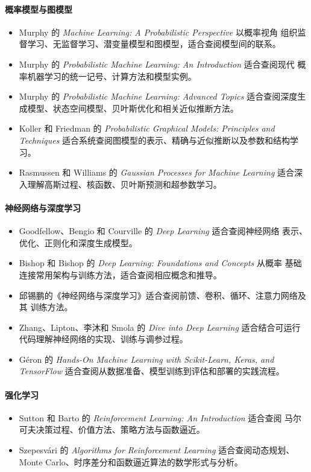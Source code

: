 \paragraph*{概率模型与图模型}
\begin{itemize}
  \item Murphy 的 \emph{Machine Learning: A Probabilistic Perspective} 以概率视角
    组织监督学习、无监督学习、潜变量模型和图模型，适合查阅模型间的联系。
  \item Murphy 的 \emph{Probabilistic Machine Learning: An Introduction} 适合查阅现代
    概率机器学习的统一记号、计算方法和模型实例。
  \item Murphy 的 \emph{Probabilistic Machine Learning: Advanced Topics}
    适合查阅深度生成模型、状态空间模型、贝叶斯优化和相关近似推断方法。
  \item Koller 和 Friedman 的 \emph{Probabilistic Graphical Models: Principles and
    Techniques} 适合系统查阅图模型的表示、精确与近似推断以及参数和结构学习。
  \item Rasmussen 和 Williams 的 \emph{Gaussian Processes for Machine Learning}
    适合深入理解高斯过程、核函数、贝叶斯预测和超参数学习。
\end{itemize}

\paragraph*{神经网络与深度学习}
\begin{itemize}
  \item Goodfellow、Bengio 和 Courville 的 \emph{Deep Learning} 适合查阅神经网络
    表示、优化、正则化和深度生成模型。
  \item Bishop 和 Bishop 的 \emph{Deep Learning: Foundations and Concepts} 从概率
    基础连接常用架构与训练方法，适合查阅相应概念和推导。
  \item 邱锡鹏的《神经网络与深度学习》适合查阅前馈、卷积、循环、注意力网络及其
    训练方法。
  \item Zhang、Lipton、李沐和 Smola 的 \emph{Dive into Deep Learning}
    适合结合可运行代码理解神经网络的实现、训练与调参过程。
  \item Géron 的 \emph{Hands-On Machine Learning with Scikit-Learn, Keras, and TensorFlow}
    适合查阅从数据准备、模型训练到评估和部署的实践流程。
\end{itemize}

\paragraph*{强化学习}
\begin{itemize}
  \item Sutton 和 Barto 的 \emph{Reinforcement Learning: An Introduction} 适合查阅
    马尔可夫决策过程、价值方法、策略方法与函数逼近。
  \item Szepesvári 的 \emph{Algorithms for Reinforcement Learning} 适合查阅动态规划、
    Monte Carlo、时序差分和函数逼近算法的数学形式与分析。
\end{itemize}

